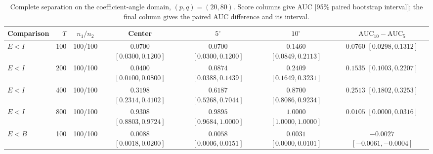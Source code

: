 \documentclass[12pt,letterpaper]{article}
\def\spacingset#1{\renewcommand{\baselinestretch}{#1}\small\normalsize}
\theoremstyle{plain}
\theoremstyle{definition}
\begin{document}
\begin{table}[p]
\begingroup
\spacingset{1.0}
\small\centering
\caption{Complete separation on the coefficient-angle domain, $(p,q)=(20,80)$. Score columns give AUC [95\% paired bootstrap interval]; the final column gives the paired AUC difference and its interval.}
\label{s23:lambda:allauc:p20q80}
\footnotesize
\setlength{\tabcolsep}{3.5pt}
\renewcommand{\arraystretch}{1.10}
\begin{adjustbox}{max width=\linewidth}
\begin{tabular}{lrccccc}
\toprule
Comparison & $T$ & $n_1/n_2$ & Center & $5^\circ$ & $10^\circ$ & $\mathrm{AUC}_{10}-\mathrm{AUC}_{5}$\\
\midrule
$E<I$ & 100 & 100/100 & \shortstack{$0.0700$\\{\scriptsize$[0.0300,0.1200]$}} & \shortstack{$0.0700$\\{\scriptsize$[0.0300,0.1200]$}} & \shortstack{$0.1460$\\{\scriptsize$[0.0849,0.2113]$}} & \shortstack{$0.0760$\\{\scriptsize$[0.0298,0.1312]$}}\\
$E<I$ & 200 & 100/100 & \shortstack{$0.0400$\\{\scriptsize$[0.0100,0.0800]$}} & \shortstack{$0.0874$\\{\scriptsize$[0.0388,0.1439]$}} & \shortstack{$0.2409$\\{\scriptsize$[0.1649,0.3231]$}} & \shortstack{$0.1535$\\{\scriptsize$[0.1003,0.2207]$}}\\
$E<I$ & 400 & 100/100 & \shortstack{$0.3198$\\{\scriptsize$[0.2314,0.4102]$}} & \shortstack{$0.6187$\\{\scriptsize$[0.5268,0.7044]$}} & \shortstack{$0.8700$\\{\scriptsize$[0.8086,0.9234]$}} & \shortstack{$0.2513$\\{\scriptsize$[0.1802,0.3253]$}}\\
$E<I$ & 800 & 100/100 & \shortstack{$0.9308$\\{\scriptsize$[0.8803,0.9724]$}} & \shortstack{$0.9895$\\{\scriptsize$[0.9684,1.0000]$}} & \shortstack{$1.0000$\\{\scriptsize$[1.0000,1.0000]$}} & \shortstack{$0.0105$\\{\scriptsize$[0.0000,0.0316]$}}\\
\addlinespace
$E<B$ & 100 & 100/100 & \shortstack{$0.0088$\\{\scriptsize$[0.0018,0.0200]$}} & \shortstack{$0.0058$\\{\scriptsize$[0.0006,0.0151]$}} & \shortstack{$0.0031$\\{\scriptsize$[0.0000,0.0101]$}} & \shortstack{$-0.0027$\\{\scriptsize$[-0.0061,-0.0004]$}}\\

\end{tabular}
\end{adjustbox}
\end{table}
\end{document}
